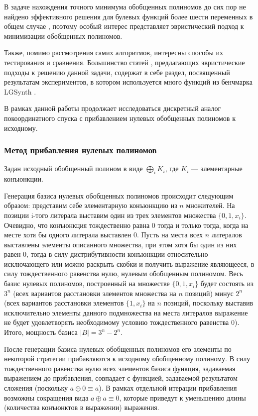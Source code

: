 \documentclass[a4paper,12pt,titlepage,finall]{article}
\begin{document}
В задаче нахождения точного минимума обобщенных полиномов до сих пор не найдено эффективного решения для булевых функций более шести переменных в общем случае \cite{exact}, поэтому особый интерес представляет эвристический подход к минимизации обобщенных полиномов.

Также, помимо рассмотрения самих алгоритмов, интересны способы их тестирования и сравнения. Большинство статей \cite{exmin2} \cite{mint} \cite{exorcism4}, предлагающих эвристические подходы к решению данной задачи, содержат в себе раздел, посвященный результатам экспериментов, в котором используется много функций из бенчмарка LGSynth \cite{benchmark}.

В рамках данной работы продолжает исследоваться дискретный аналог покоординатного спуска с прибавлением нулевых обобщенных полиномов к исходному.

\subsubsection*{Метод прибавления нулевых полиномов}

Задан исходный обобщенный полином в виде $ \bigoplus\limits_i K_i $, где $ K_i $ --- элементарные конъюнкции.

Генерация базиса нулевых обобщенных полиномов происходит следующим образом: представим себе элементарную конъюнкцию из $ n $ множителей. На позиции i-того литерала выставим один из трех элементов множества $ \{ 0, 1, x_i \} $. Очевидно, что конъюнкция тождественно равна 0 тогда и только тогда, когда на месте хотя бы одного литерала выставлен 0. Пусть на места всех $ n $ литералов выставлены элементы описанного множества, при этом хотя бы один из них равен 0, тогда в силу дистрибутивности конъюнкции относительно исключающего или можно раскрыть скобки и получить выражение являющееся, в силу тождественного равенства нулю, нулевым обобщенным полиномом. Весь базис нулевых полиномов, построенный на множестве $ \{ 0, 1, x_i \} $ будет состоять из $ 3^n $ (всех вариантов расстановки элементов множества на $ n $ позиций) минус $ 2^n $ (всех вариантов расстановки элементов $ \{ 1, x_i \} $ на $ n $ позиций, поскольку выставив исключительно элементы данного подмножества на места литералов выражение не будет удовлетворять необходимому условию тождественного равенства 0). Итого, мощность базиса $ \left| B \right| = 3^n - 2^n. $

После генерации базиса нулевых обобщенных полиномов его элементы по некоторой стратегии прибавляются к исходному обобщенному полиному. В силу тождественного равенства нулю всех элементов базиса функция, задаваемая выражением до прибавления, совпадает с функцией, задаваемой результатом сложения (поскольку $ a \oplus 0 \equiv a $). В рамках отдельной итерации прибавления возможны сокращения вида $ a \oplus a \equiv 0 $, которые приведут к уменьшению длины (количества конъюнктов в выражении) выражения.
\end{document}
